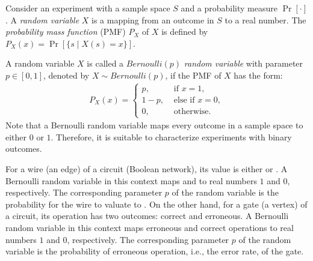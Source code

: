 Consider an experiment with a sample space $S$ and a probability measure $\Pr[\cdot]$.
A \textit{random variable} $X$ is a mapping from an outcome in $S$ to a real number.
The \textit{probability mass function} (PMF) $P_X$ of $X$
is defined by $P_X(x)=\Pr[\{s \mid X(s)=x\}]$.

A random variable $X$ is called a $\textit{Bernoulli}(p)$ \textit{random variable} with parameter $p\in[0,1]$,
denoted by $X\sim\textit{Bernoulli}(p)$,
if the PMF of $X$ has the form:
\begin{align*}
    P_X(x)=
    \left\{
    \begin{array}{ll}
        p,   & \mbox{ if } x = 1,      \\
        1-p, & \mbox{ else if } x = 0, \\
        0,   & \mbox{ otherwise. }
    \end{array}
    \right.
\end{align*}
Note that a Bernoulli random variable maps every outcome in a sample space to either $0$ or $1$.
Therefore, it is suitable to characterize experiments with binary outcomes.

For a wire (an edge) of a circuit (Boolean network),
its value is either \true or \false.
A Bernoulli random variable in this context maps \true and \false to real numbers $1$ and $0$, respectively.
The corresponding parameter $p$ of the random variable is the probability for the wire to valuate to \true.
On the other hand, for a gate (a vertex) of a circuit,
its operation has two outcomes: correct and erroneous.
A Bernoulli random variable in this context maps erroneous and correct operations to real numbers $1$ and $0$, respectively.
The corresponding parameter $p$ of the random variable is the probability of erroneous operation,
i.e., the error rate, of the gate.